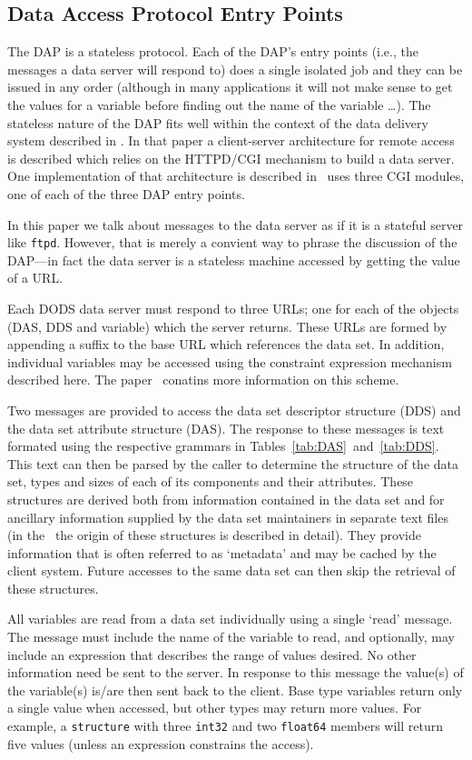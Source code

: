 \subsection{Data Access Protocol Entry Points}
\label{entry}

The DAP is a stateless protocol. Each of the DAP's entry points (i.e., the
messages a data server will respond to) does a single isolated job and they
can be issued in any order (although in many applications it will not make
sense to get the values for a variable before finding out the name of the
variable \ldots). The stateless nature of the DAP fits well within the
context of the data delivery system described in \DDA\@.  In that paper a
client-server architecture for remote access is described which relies on the
HTTPD/CGI mechanism to build a data server. One implementation of that
architecture is described in \DDD\ uses three CGI modules, one of each of the
three DAP entry points.

In this paper we talk about messages to the data server as if it is a
stateful server like {\tt ftpd}. However, that is merely a convient way to
phrase the discussion of the DAP---in fact the data server is a stateless
machine accessed by getting the value of a URL\@. 

Each DODS data server must respond to three URLs; one for each of the objects
(DAS, DDS and variable) which the server returns. These URLs are formed by
appending a suffix to the base URL which references the data set. In
addition, individual variables may be accessed using the constraint
expression mechanism described here. The paper \URL\ conatins more
information on this scheme.

Two messages are provided to access the data set descriptor structure (DDS)
and the data set attribute structure (DAS)\@. The response to these messages
is text formated using the respective grammars in
Tables~\ref{tab:DAS}~and~\ref{tab:DDS}. This text can then be parsed by the
caller to determine the structure of the data set, types and sizes of each of
its components and their attributes. These structures are derived both from
information contained in the data set and for ancillary information supplied
by the data set maintainers in separate text files (in the \ddd\ the origin
of these structures is described in detail). They provide information that is
often referred to as `metadata' and may be cached by the client system.
Future accesses to the same data set can then skip the retrieval of these
structures.

All variables are read from a data set individually using a single `read'
message. The message must include the name of the variable to read, and
optionally, may include an expression that describes the range of values
desired. No other information need be sent to the server. In response to this
message the value(s) of the variable(s) is/are then sent back to the client.
Base type variables return only a single value when accessed, but other types
may return more values. For example, a {\tt structure} with three {\tt int32}
and two {\tt float64} members will return five values (unless an expression
constrains the access).


